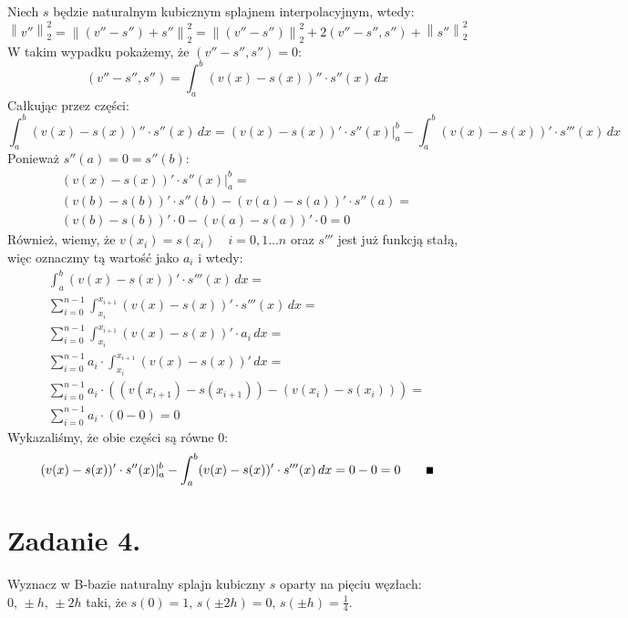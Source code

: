 \documentclass[a4paper]{article}
\renewcommand\qedsymbol{\scalebox{0.75}{$\blacksquare$}} %
\begin{document}
      Niech $s$ będzie naturalnym kubicznym splajnem interpolacyjnym, wtedy:
      \[
         \left\| v'' \right\|_{2}^{2} =
         \left\| (v'' - s'') + s'' \right\|_{2}^{2} =
         \left\| (v'' - s'') \right\|_{2}^{2} + 2(v'' - s'', s'') + \left\| s'' \right\|_{2}^{2}
      \]
      W takim wypadku pokażemy, że $(v'' - s'', s'') = 0$:
      \[
         (v'' - s'', s'') = \int_{a}^{b} (v(x) - s(x))'' \cdot s''(x) \, dx
      \]
      Całkując przez części:
      \[
         \int_{a}^{b} (v(x) - s(x))'' \cdot s''(x) \, dx =
         (v(x) - s(x))' \cdot s''(x) |_{a}^{b} - \int_{a}^{b} (v(x) - s(x))' \cdot s'''(x) \, dx
      \]
      Ponieważ $s''(a) = 0 = s''(b)$:
      \begin{gather*}
         (v(x) - s(x))' \cdot s''(x) |_{a}^{b} = \\
         (v(b) - s(b))' \cdot s''(b) - (v(a) - s(a))' \cdot s''(a) = \\
         (v(b) - s(b))' \cdot 0 - (v(a) - s(a))' \cdot 0 = 0
      \end{gather*}
      Również, wiemy, że $v(x_{i}) = s(x_{i}) \quad i = 0, 1 \dots n$
      oraz $s'''$ jest już funkcją stałą, więc oznaczmy tą wartość jako $a_{i}$ i wtedy:
      \begin{gather*}
         \int_{a}^{b} (v(x) - s(x))' \cdot s'''(x) \, dx = \\
         \sum_{i = 0}^{n-1} \int_{x_{i}}^{x_{i+1}} (v(x) - s(x))' \cdot s'''(x) \, dx = \\
         \sum_{i = 0}^{n-1} \int_{x_{i}}^{x_{i+1}} (v(x) - s(x))' \cdot a_{i} \, dx = \\
         \sum_{i = 0}^{n-1} a_{i} \cdot \int_{x_{i}}^{x_{i+1}} (v(x) - s(x))' \, dx = \\
         \sum_{i = 0}^{n-1} a_{i} \cdot ((v(x_{i+1}) - s(x_{i+1})) - (v(x_{i}) - s(x_{i}))) = \\
         \sum_{i = 0}^{n-1} a_{i} \cdot (0 - 0) = 0
      \end{gather*}
      Wykazaliśmy, że obie części są równe 0:
      \[
         (v(x) - s(x))' \cdot s''(x) |_{a}^{b} - \int_{a}^{b} (v(x) - s(x))' \cdot s'''(x) \, dx =
         0 - 0 = 0
         \quad \quad \qedsymbol
      \]


   \section*{Zadanie 4.}

      Wyznacz w B-bazie naturalny splajn kubiczny $s$ oparty na pięciu węzłach: $0, \, \pm h, \, \pm 2h$ taki,
      że $s(0) = 1, \, s(\pm 2h) = 0, \, s(\pm h) = \frac{1}{4}$.
\end{document}
